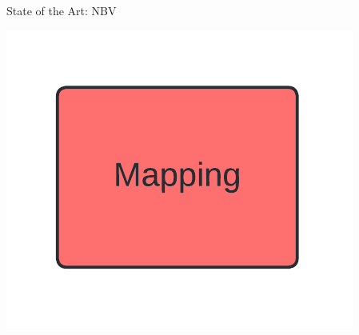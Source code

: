 \documentclass{beamer}
\begin{document}
\begin{frame}{State of the Art: NBV}
\begin{textblock*}{0.2\textwidth}
		\includegraphics[width=\textwidth]{Graphics/mapping_flow.png}
	\end{textblock*}
\end{frame}
\end{document}
